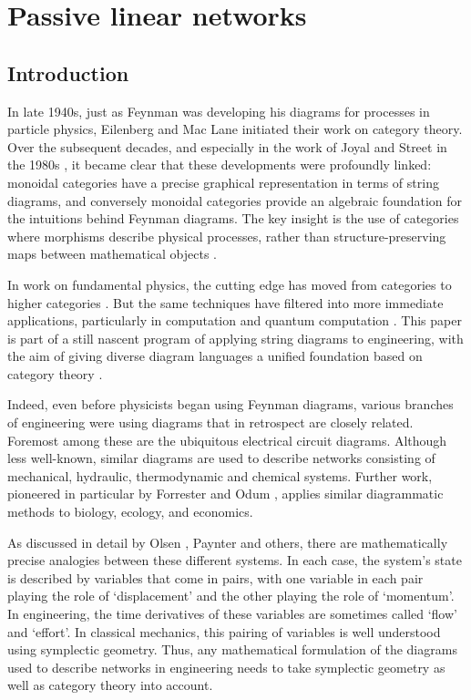 \chapter{Passive linear networks} \label{ch.circuits}


\section{Introduction}\label{sec:intro}
In late 1940s, just as Feynman was developing his diagrams for processes in particle physics, Eilenberg and Mac Lane initiated their work on category theory.  Over the subsequent decades, and especially in the work of Joyal and Street in the 1980s \cite{JS1,JS2}, it became clear that these developments were profoundly linked: monoidal categories have a precise graphical representation in terms of string diagrams, and conversely monoidal categories provide an algebraic foundation for the intuitions behind Feynman diagrams.  The key insight is the use of categories where morphisms describe physical processes, rather than structure-preserving maps between mathematical objects \cite{BaezStay,CP}.

In work on fundamental physics, the cutting edge has moved from categories
to higher categories \cite{BL}.  But the same techniques have filtered into more immediate applications, particularly in computation and quantum computation \cite{AC,Ba1,Se}.  This paper is part of a still nascent program of applying string diagrams to engineering, with the aim of giving diverse diagram languages a unified foundation based on category theory \cite{BE,BSZ,KSW,RSW,Sp}. 

Indeed, even before physicists began using Feynman diagrams, various branches of engineering were using diagrams that in retrospect are closely related.   Foremost among these are the ubiquitous electrical circuit diagrams. Although less well-known, similar diagrams are used to describe networks consisting of mechanical, hydraulic, thermodynamic and chemical systems.   Further work, pioneered in particular by 
Forrester \cite{Fo} and Odum \cite{Od}, applies similar diagrammatic methods to biology, ecology, and economics.

As discussed in detail by Olsen \cite{Ol}, Paynter \cite{Pa} and others, there are mathematically precise analogies between these different systems.  In each case, the system's state is described by variables that come in pairs, with one variable in each pair playing the role of  `displacement' and the other playing the role of `momentum'.  In engineering, the time derivatives of these variables are sometimes called `flow' and `effort'.    In classical mechanics, this pairing of variables is well understood using
symplectic geometry.  Thus, any mathematical formulation of the diagrams used to
describe networks in engineering needs to take symplectic geometry as well as category
theory into account. 

